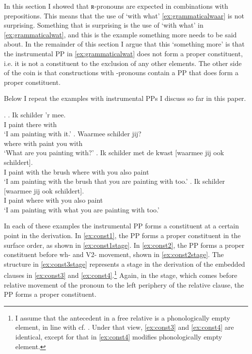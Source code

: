 \documentclass[12pt]{article}
\begin{document}
In this section I showed that ʀ-pronouns are expected in combinations with prepositions. This means that the use of  `with what' \ref{ex:grammaticalwaar} is not surprising. Something that is surprising is the use of  `with what' in \ref{ex:grammaticalwat}, and this is the example something more needs to be said about. In the remainder of this section I argue that this `something more' is that the instrumental PP in \ref{ex:grammaticalwat} does not form a proper constituent, i.e. it is not a constituent to the exclusion of any other elements. The other side of the coin is that constructions with -pronouns contain a PP that does form a proper constituent.

Below I repeat the examples with instrumental PPs I discuss so far in this paper.

\ex.
\ag. Ik schilder 'r mee.\\
 I paint there with\\
 `I am painting with it.'\label{ex:const1}
\bg. Waarmee schilder jij?\\
{where with} paint you with\\
 `What are you painting with?'\label{ex:const2}
\bg. Ik schilder met de kwast [waarmee jij ook schildert].\\
 I paint with the brush {where with} you also paint\\
 `I am painting with the brush that you are painting with too.'\label{ex:const3}
\bg. Ik schilder [waarmee jij ook schildert].\\
 I paint {where with} you also paint\\
 `I am painting with what you are painting with too.'\label{ex:const4}

In each of these examples the instrumental PP forms a constituent at a certain point in the derivation. In \ref{ex:const1}, the PP forms a proper constituent in the surface order, as shown in \ref{ex:const1stage}. In \ref{ex:const2}, the PP forms a proper constituent before wh- and V2- movement, shown in \ref{ex:const2stage}.
The structure in \ref{ex:const3stage} represents a stage in the derivation of the embedded clauses in \ref{ex:const3} and \ref{ex:const4}.\footnote{I assume that the antecedent in a free relative is a phonologically empty element, in line with cf. \cite{bresnan1978a,groos1981,himmelreich2017}. Under that view, \ref{ex:const3} and \ref{ex:const4} are identical, except for that in \ref{ex:const4} modifies phonologically empty element.}
Again, in the stage, which comes before relative movement of the pronoun to the left periphery of the relative clause, the PP forms a proper constituent.
\end{document}
